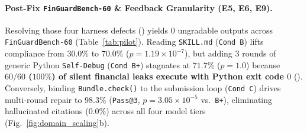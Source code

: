 \begin{table}[t]
\centering
{}
\vspace{-0.15cm}
\caption{\texttt{FinGuardBench-60} evaluation after Priority-1 harness repairs ($6\text{ tasks}\times 10\text{ domains}$). Because $60/60$ ($100\%$) of silent financial leaks exit with Python code $0$ (E9), generic Python \texttt{Self-Debug} (\texttt{Cond B+}) stagnates ($p=1.0$ vs.\ \texttt{B}), whereas enforced guard repair (\texttt{Cond C Pass@3}) reaches $98.3\%$ ($p=3.05\times 10^{-5}$ vs.\ \texttt{B+}).}
\label{tab:pilot}
\vspace{-0.22cm}
\end{table}

\paragraph{Post-Fix \texttt{FinGuardBench-60} \& Feedback Granularity (E5, E6, E9).}
Resolving those four harness defects () yields $0$ ungradable outputs across \texttt{FinGuardBench-60} (Table~\ref{tab:pilot}). Reading \texttt{SKILL.md} (\texttt{Cond B}) lifts compliance from $30.0\%$ to $70.0\%$ ($p=1.19\times 10^{-7}$), but adding 3 rounds of generic Python \texttt{Self-Debug} \citep{chen2023selfdebug} (\texttt{Cond B+}) stagnates at $71.7\%$ ($p=1.0$) because \textbf{$60/60$ ($100\%$) of silent financial leaks execute with Python exit code $0$} (). Conversely, binding \texttt{Bundle.check()} to the submission loop (\texttt{Cond C}) drives multi-round repair to $\mathbf{98.3\%}$ (\texttt{Pass@3}, $p=3.05\times 10^{-5}$ vs.\ \texttt{B+}), eliminating hallucinated citations ($0.0\%$) across all four model tiers (Fig.~\ref{fig:domain_scaling}b).

